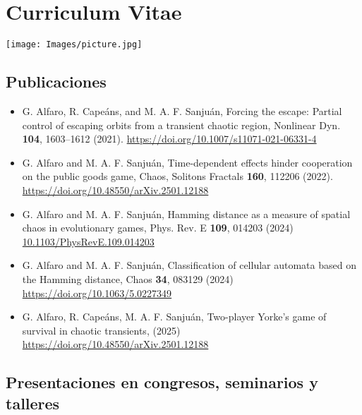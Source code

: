 \chapter*{Curriculum Vitae}


\hspace{10cm}\texttt{[image: Images/picture.jpg]}



\section*{Publicaciones}

\begin{itemize}

\item
G. Alfaro, R. Capeáns, and M. A. F. Sanjuán,
Forcing the escape: Partial control of escaping orbits from a
transient chaotic region,
Nonlinear Dyn. \textbf{104}, 1603--1612 (2021).
\url{https://doi.org/10.1007/s11071-021-06331-4}

\item
G. Alfaro and M. A. F. Sanjuán,
Time-dependent effects hinder cooperation on the public goods game,
Chaos, Solitons Fractals \textbf{160}, 112206 (2022).
\url{https://doi.org/10.48550/arXiv.2501.12188}


\item
G. Alfaro and M. A. F. Sanjuán,
Hamming distance as a measure of spatial chaos in evolutionary games,
Phys. Rev. E \textbf{109}, 014203 (2024)
\url{10.1103/PhysRevE.109.014203}

\item
G. Alfaro and M. A. F. Sanjuán,
Classification of cellular automata based on the Hamming
distance,
Chaos \textbf{34}, 083129 (2024)
\url{https://doi.org/10.1063/5.0227349}


\item
G. Alfaro, R. Capeáns, M. A. F. Sanjuán,
Two-player Yorke's game of survival in chaotic transients,
(2025)
\url{https://doi.org/10.48550/arXiv.2501.12188}


\end{itemize}



\section*{Presentaciones en congresos, seminarios y talleres}

